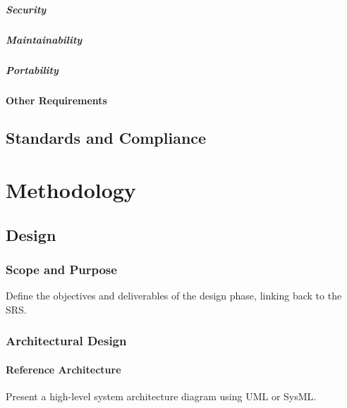 \documentclass[12pt,a4paper]{report}
\begin{document}
\paragraph{Security}

\paragraph{Maintainability}

\paragraph{Portability}

\subsubsection{Other Requirements}

\section{Standards and Compliance}

\chapter{Methodology}
\label{chap:methodology}

\section{Design}
\label{sec:design}

\subsection{Scope and Purpose}
Define the objectives and deliverables of the design phase, linking back to the SRS.

\subsection{Architectural Design}
\subsubsection{Reference Architecture}
Present a high-level system architecture diagram using UML or SysML.
\end{document}
